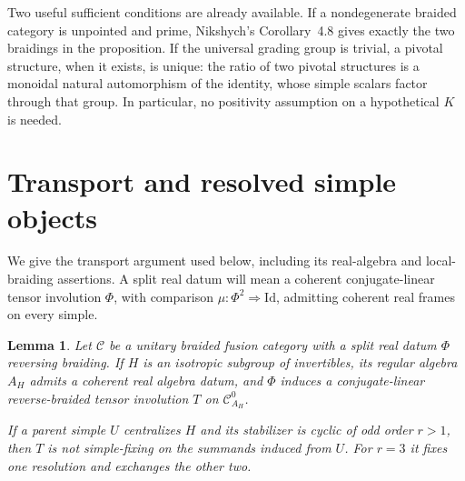 \documentclass[11pt]{amsart}
\newtheorem{lemma}[theorem]{Lemma}
\theoremstyle{remark}
\begin{document}
Two useful sufficient conditions are already available. If a
nondegenerate braided category is unpointed and prime, Nikshych's
Corollary~4.8 gives exactly the two braidings in the proposition. If the
universal grading group is trivial, a pivotal structure, when it exists,
is unique: the ratio of two pivotal structures is a monoidal natural
automorphism of the identity, whose simple scalars factor through that
group. In particular, no positivity assumption on a hypothetical $K$
is needed.

\section{Transport and resolved simple objects}\label{sec:transport}

We give the transport argument used below, including its real-algebra
and local-braiding assertions. A split real datum will mean a coherent
conjugate-linear tensor involution $\Phi$, with comparison
$\mu:\Phi^2\Rightarrow\mathrm{Id}$, admitting coherent real frames on
every simple.

\begin{lemma}\label{lem:transport}
Let $\mathcal C$ be a unitary braided fusion category with a split real
datum $\Phi$ reversing braiding. If $H$ is an isotropic subgroup of
invertibles, its regular algebra $A_H$ admits a coherent real algebra
datum, and $\Phi$ induces a conjugate-linear reverse-braided tensor
involution $T$ on $\mathcal C_{A_H}^0$.

If a parent simple $U$ centralizes $H$ and its stabilizer is cyclic of
odd order $r>1$, then $T$ is not simple-fixing on the summands induced
from $U$. For $r=3$ it fixes one resolution and exchanges the other two.
\end{lemma}
\end{document}
